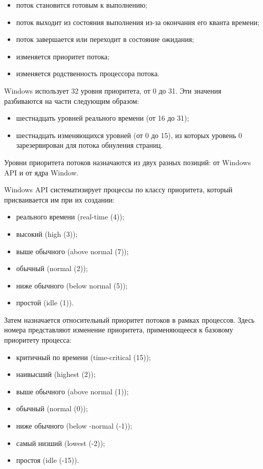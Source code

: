 \begin{itemize}
	\item поток становится готовым к выполнению;
	\item поток выходит из состояния выполнения из-за окончания его кванта времени;
	\item поток завершается или переходит в состояние ожидания;
	\item изменяется приоритет потока;
	\item изменяется родственность процессора потока.
\end{itemize}


Windows использует 32 уровня приоритета, от 0 до 31. Эти значения  разбиваются на части следующим образом:
\begin{itemize}
		\item шестнадцать уровней реального времени (от 16 до 31);
		\item шестнадцать изменяющихся уровней (от 0 до 15), из которых уровень 0 зарезервирован для потока обнуления страниц. 
\end{itemize}
 

Уровни приоритета потоков назначаются из двух разных позиций: от Windows API и от ядра Window.

Windows API систематизирует процессы по классу приоритета, который присваивается им при их создании:
\begin{itemize}
	\item реального времени (real-time (4));
	\item высокий (high (3));
	\item выше обычного (above normal (7));
	\item обычный (normal (2));
	\item ниже обычного (below normal (5));
	\item простой (idle (1)).
\end{itemize}

Затем назначается относительный приоритет потоков в рамках процессов. Здесь номера представляют изменение приоритета, применяющееся к базовому приоритету процесса:
\begin{itemize}
	\item критичный по времени (time-critical (15));
	\item наивысший (highest (2));
	\item выше обычного (above normal (1));
	\item обычный (normal (0));
	\item ниже обычного (below -normal (-1));
	\item самый низший (lowest (-2));
	\item простоя (idle (-15)).
\end{itemize}

